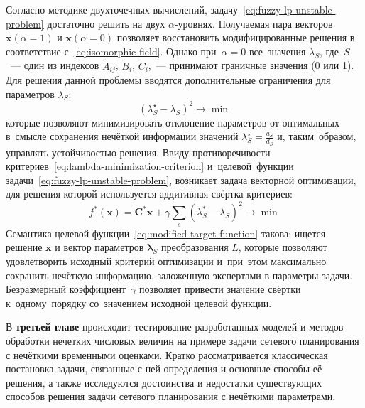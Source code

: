 Согласно методике двухточечных вычислений, задачу~\eqref{eq:fuzzy-lp-unstable-problem} достаточно решить на двух $\alpha$-уровнях. Получаемая пара векторов $\mathbf{x}\left( \alpha =1 \right)$ и $\mathbf{x}\left( \alpha =0 \right)$ позволяет восстановить модифицированные решения в соответствие с~\eqref{eq:isomorphic-field}. Однако при~$\alpha=0$ все~значения $\lambda_S$, где~$S$~--- один из индексов $\tilde A_{ij}$, $\tilde B_i$, $\tilde C_i$,~--- принимают граничные значения (0 или 1). Для решения данной проблемы вводятся дополнительные ограничения для параметров $\lambda_S$:
\begin{equation}
\label{eq:lambda-minimization-criterion}
  {\left( \lambda_{S}^{\star}-\lambda_S \right)}^2\to \min
\end{equation}
которые позволяют минимизировать отклонение параметров от оптимальных в~смысле сохранения нечёткой информации значений $\displaystyle \lambda_{S}^{\star}=\frac{a_S}{d_S}$ и, таким~образом, управлять устойчивостью решения. Ввиду противоречивости критериев~\eqref{eq:lambda-minimization-criterion} и~целевой~функции задачи~\eqref{eq:fuzzy-lp-unstable-problem}, возникает задача векторной оптимизации, для решения которой используется аддитивная свёртка критериев:
\begin{equation}
\label{eq:modified-target-function}
  f^{*}\left( \mathbf{x} \right)=\mathbf{C}^{*}\mathbf{x}+\gamma \sum\limits_{s}^{}{\left(\lambda_{S}^{*}-\lambda_S \right)}^{2} \to \min
\end{equation}
Семантика целевой функции~\eqref{eq:modified-target-function} такова: ищется решение $\mathbf{x}$ и вектор параметров $\mathbf{\lambda}_S$ преобразования $L$, которые позволяют удовлетворить исходный критерий оптимизации и~при~этом максимально сохранить нечёткую информацию, заложенную экспертами в параметры задачи. Безразмерный коэффициент~$\gamma$ позволяет привести значение свёртки к~одному~порядку со~значением исходной целевой функции.

В \textbf{третьей главе} происходит тестирование разработанных моделей и методов обработки нечетких числовых величин на примере задачи сетевого планирования с нечёткими временными оценками. Кратко рассматривается классическая постановка задачи, связанные с ней определения и основные способы её решения, а также исследуются достоинства и недостатки существующих способов решения задачи сетевого планирования с нечёткими параметрами.

